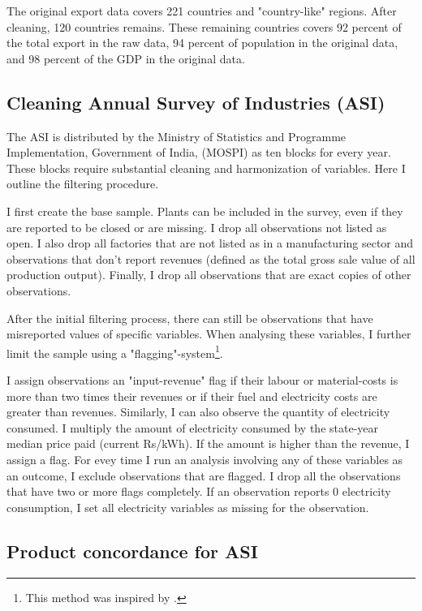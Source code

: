 \documentclass[11pt]{article}
\begin{document}
\begin{appendices}
The original export data covers 221 countries and "country-like" regions. After cleaning, 120 countries remains. These remaining countries covers 92 percent of the total export in the raw data, 94 percent of population in the original data, and 98 percent of the GDP in the original data. 

\subsection{Cleaning Annual Survey of Industries (ASI)}%
\label{sub:cleaning_annual_survey_of_industries_asi}

The ASI is distributed by the Ministry of Statistics and Programme Implementation, Government of India, (MOSPI) as ten blocks for every year. These blocks require substantial cleaning and harmonization of variables. Here I outline the filtering procedure.

I first create the base sample. Plants can be included in the survey, even if they are reported to be closed or are missing. I drop all observations not listed as open. I also drop all factories that are not listed as in a manufacturing sector and observations that don't report revenues (defined as the total gross sale value of all production output). Finally, I drop all observations that are exact copies of other observations.

After the initial filtering process, there can still be observations that have misreported values of specific variables. When analysing these variables, I further limit the sample using a "flagging"-system\footnote{This method was inspired by \cite{allcott_how_2016}.}. 

I assign observations an "input-revenue" flag if their labour or material-costs is more than two times their revenues or if their fuel and electricity costs are greater than revenues. Similarly, I can also observe the quantity of electricity consumed. I multiply the amount of electricity consumed by the state-year median price paid (current Rs/kWh). If the amount is higher than the revenue, I assign a flag. For evey time I run an analysis involving any of these variables as an outcome, I exclude observations that are flagged. I drop all the observations that have two or more flags completely. If an observation reports 0 electricity consumption, I set all electricity variables as missing for the observation.

\subsection{Product concordance for ASI}%
\label{sub:product_concordance_asi}


\end{appendices}
\end{document}
